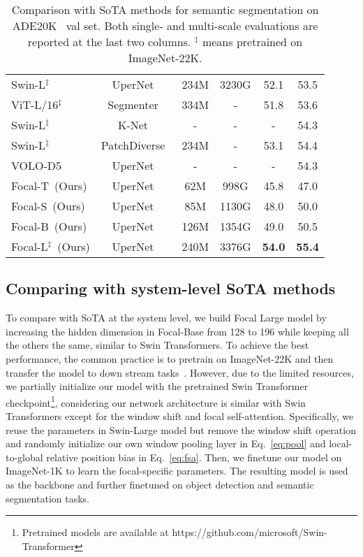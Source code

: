 \documentclass{article}
\newcommand{\adevalss}{\textbf{54.0}}
\newcommand{\adevalms}{\textbf{55.4}}
\begin{document}
\begin{table}
\begin{minipage}{0.47\linewidth}
{\begin{tabular}{lccc|cc}
    Swin-L$^{\ddagger}$~\cite{liu2021swin} & UperNet~\cite{xiao2018unified} & 234M & 3230G & 52.1 & 53.5 \\
    ViT-L/16$^{\ddagger}$~\cite{dosovitskiy2020image} & Segmenter~\cite{strudel2021segmenter} & 334M & - & 51.8 & 53.6 \\
    Swin-L$^{\ddagger}$~\cite{liu2021swin} & K-Net~\cite{zhang2021knet} & - & - & - & 54.3 \\
    Swin-L$^{\ddagger}$~\cite{liu2021swin} & PatchDiverse~\cite{gong2021vision} & 234M & - & 53.1 & 54.4 \\
    VOLO-D5~\cite{yuan2021volo} & UperNet~\cite{xiao2018unified} & - & - & - & 54.3 \\
    \midrule
     \rowcolor{Gray} 
    Focal-T~(Ours) & UperNet~\cite{xiao2018unified} & 62M & 998G & 45.8 & 47.0 \\
     \rowcolor{Gray} 
    Focal-S~(Ours) & UperNet~\cite{xiao2018unified} & 85M & 1130G & 48.0 & 50.0\\     
     \rowcolor{Gray} 
    Focal-B~(Ours) & UperNet~\cite{xiao2018unified} & 126M & 1354G & 49.0 & 50.5 \\      
     \rowcolor{Gray} 
    Focal-L$^{\ddagger}$~(Ours) & UperNet~\cite{xiao2018unified} & 240M & 3376G & \adevalss & \adevalms  \\   
    \bottomrule
\end{tabular} 
  }
  \vspace{2pt}
  \caption{Comparison with SoTA methods for semantic segmentation on ADE20K~\cite{zhou2017scene} val set. Both single- and multi-scale evaluations are reported at the last two columns. $^{\ddagger}$ means pretrained on ImageNet-22K.}
  \label{tab:semantic_segmentation}
  \end{minipage}  
\end{table}

\subsection{Comparing with system-level SoTA methods}
To compare with SoTA at the system level, we build Focal Large model by increasing the hidden dimension in Focal-Base from 128 to 196 while keeping all the others the same, similar to Swin Transformers. 
To achieve the best performance, the common practice is to pretrain on ImageNet-22K and then transfer the model to down stream tasks~\cite{wu2021cvt,liu2021swin}. However, due to the limited resources, we partially initialize our model with the pretrained Swin Transformer checkpoint\footnote{Pretrained models are available at https://github.com/microsoft/Swin-Transformer}, considering our network architecture is similar with Swin Transformers except for the window shift and focal self-attention. 
Specifically, we reuse the parameters in Swin-Large model but remove the window shift operation and randomly initialize our own window pooling layer in Eq.~\eqref{eq:pool} and local-to-global relative position bias in Eq.~\eqref{eq:fsa}. Then, we finetune our model on ImageNet-1K to learn the focal-specific parameters. The resulting model is used as the backbone and further finetuned on object detection and semantic segmentation tasks.
\end{document}
